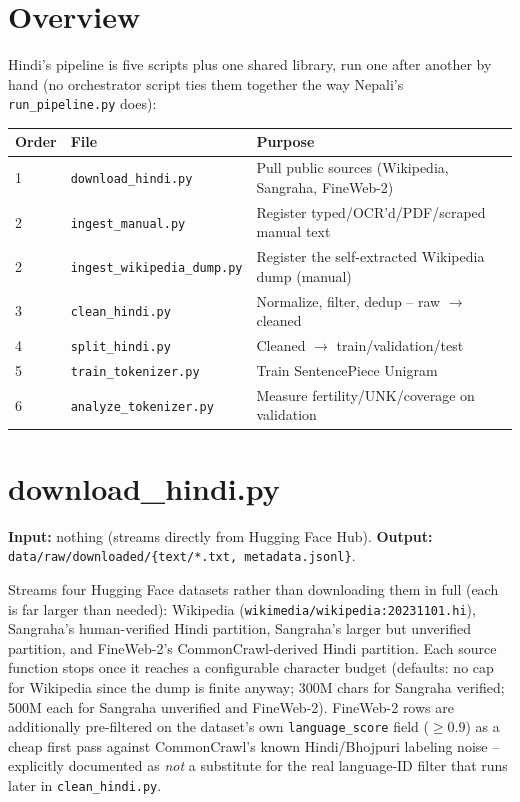 \documentclass[11pt]{report}
\begin{document}
\section{Overview}

Hindi's pipeline is five scripts plus one shared library, run one after
another by hand (no orchestrator script ties them together the way
Nepali's \texttt{run\_pipeline.py} does):

\begin{center}
\begin{tabular}{lll}
\toprule
Order & File & Purpose \\
\midrule
1 & \texttt{download\_hindi.py} & Pull public sources (Wikipedia, Sangraha, FineWeb-2) \\
2 & \texttt{ingest\_manual.py} & Register typed/OCR'd/PDF/scraped manual text \\
2 & \texttt{ingest\_wikipedia\_dump.py} & Register the self-extracted Wikipedia dump (manual) \\
3 & \texttt{clean\_hindi.py} & Normalize, filter, dedup -- raw $\to$ cleaned \\
4 & \texttt{split\_hindi.py} & Cleaned $\to$ train/validation/test \\
5 & \texttt{train\_tokenizer.py} & Train SentencePiece Unigram \\
6 & \texttt{analyze\_tokenizer.py} & Measure fertility/UNK/coverage on validation \\
\bottomrule
\end{tabular}
\end{center}

\section{download\_hindi.py}

\textbf{Input:} nothing (streams directly from Hugging Face Hub).
\textbf{Output:} \texttt{data/raw/downloaded/\{text/*.txt, metadata.jsonl\}}.

Streams four Hugging Face datasets rather than downloading them in full
(each is far larger than needed): Wikipedia
(\texttt{wikimedia/wikipedia:20231101.hi}), Sangraha's human-verified
Hindi partition, Sangraha's larger but unverified partition, and
FineWeb-2's CommonCrawl-derived Hindi partition. Each source function
stops once it reaches a configurable character budget (defaults: no cap
for Wikipedia since the dump is finite anyway; 300M chars for Sangraha
verified; 500M each for Sangraha unverified and FineWeb-2). FineWeb-2
rows are additionally pre-filtered on the dataset's own
\texttt{language\_score} field ($\geq 0.9$) as a cheap first pass against
CommonCrawl's known Hindi/Bhojpuri labeling noise -- explicitly documented
as \textit{not} a substitute for the real language-ID filter that runs
later in \texttt{clean\_hindi.py}.
\end{document}
